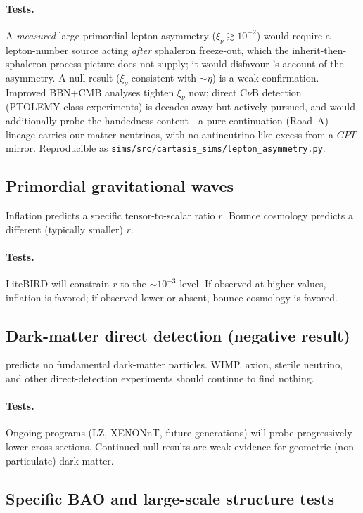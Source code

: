 \paragraph{Tests.} A \emph{measured} large primordial lepton asymmetry
($\xi_\nu\gtrsim10^{-2}$) would require a lepton-number source acting \emph{after}
sphaleron freeze-out, which the inherit-then-sphaleron-process picture does not
supply; it would disfavour \SCT's account of the asymmetry. A null result
($\xi_\nu$ consistent with $\sim\eta$) is a weak confirmation. Improved BBN$+$CMB
analyses tighten $\xi_\nu$ now; direct C$\nu$B detection (PTOLEMY-class
experiments) is decades away but actively pursued, and would additionally probe
the handedness content---a pure-continuation (Road~A) lineage carries our
matter neutrinos, with no antineutrino-like excess from a $CPT$ mirror.
Reproducible as \texttt{sims/src/cartasis\_sims/lepton\_asymmetry.py}.

\subsection{Primordial gravitational waves}

Inflation predicts a specific tensor-to-scalar ratio $r$. Bounce cosmology
predicts a different (typically smaller) $r$.
\paragraph{Tests.} LiteBIRD will constrain $r$ to the $\sim 10^{-3}$ level. If
observed at higher values, inflation is favored; if observed lower or absent,
bounce cosmology is favored.

\subsection{Dark-matter direct detection (negative result)}

\SCT predicts no fundamental dark-matter particles. WIMP, axion, sterile
neutrino, and other direct-detection experiments should continue to find
nothing.
\paragraph{Tests.} Ongoing programs (LZ, XENONnT, future generations) will probe
progressively lower cross-sections. Continued null results are weak evidence for
geometric (non-particulate) dark matter.

\subsection{Specific BAO and large-scale structure tests}

